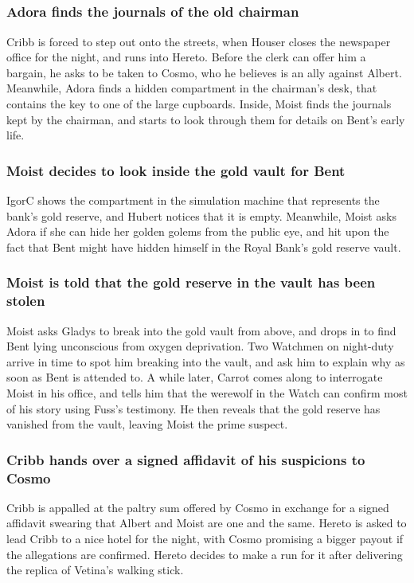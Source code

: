 \subsection{}
\subsubsection{\Gls{Adora} finds the journals of the old chairman}
\Gls{Cribb} is forced to step out onto the streets, when \Gls{Houser} closes the newspaper office
for the night, and runs into \Gls{Hereto}. Before the clerk can offer him a bargain, he asks to
be taken to \Gls{Cosmo}, who he believes is an ally against \Gls{Albert}. Meanwhile, \Gls{Adora}
finds a hidden compartment in the chairman's desk, that contains the key to one of the large
cupboards. Inside, \Gls{Moist} finds the journals kept by the chairman, and starts to look through
them for details on \Gls{Bent}'s early life.

\subsubsection{\Gls{Moist} decides to look inside the gold vault for \Gls{Bent}}
\Gls{IgorC} shows the compartment in the simulation machine that represents the bank's gold reserve,
and \Gls{Hubert} notices that it is empty. Meanwhile, \Gls{Moist} asks \Gls{Adora} if she can
hide her golden golems from the public eye, and hit upon the fact that \Gls{Bent} might have
hidden himself in the Royal Bank's gold reserve vault.

\subsubsection{\Gls{Moist} is told that the gold reserve in the vault has been stolen}
\Gls{Moist} asks \Gls{Gladys} to break into the gold vault from above, and drops in to find
\Gls{Bent} lying unconscious from oxygen deprivation. Two Watchmen on night-duty arrive in time to
spot him breaking into the vault, and ask him to explain why as soon as \Gls{Bent} is attended to.
A while later, \Gls{Carrot} comes along to interrogate \Gls{Moist} in his office, and tells him that
the werewolf in the Watch can confirm most of his story using \Gls{Fuss}'s testimony. He then
reveals that the gold reserve has vanished from the vault, leaving \Gls{Moist} the prime suspect.

\subsubsection{\Gls{Cribb} hands over a signed affidavit of his suspicions to \Gls{Cosmo}}
\Gls{Cribb} is appalled at the paltry sum offered by \Gls{Cosmo} in exchange for a signed affidavit
swearing that \Gls{Albert} and \Gls{Moist} are one and the same. \Gls{Hereto} is asked to lead
\Gls{Cribb} to a nice hotel for the night, with \Gls{Cosmo} promising a bigger payout if the
allegations are confirmed. \Gls{Hereto} decides to make a run for it after delivering the replica
of \Gls{Vetina}'s walking stick.

